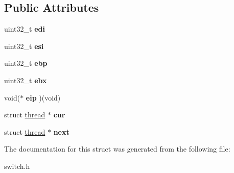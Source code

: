 \subsection*{Public Attributes}
\begin{DoxyCompactItemize}
\item 
uint32\+\_\+t {\bfseries edi}\hypertarget{structswitch__threads__frame_a4f8ccb09ef3e05eae1d9442cf2803b14}{}\label{structswitch__threads__frame_a4f8ccb09ef3e05eae1d9442cf2803b14}

\item 
uint32\+\_\+t {\bfseries esi}\hypertarget{structswitch__threads__frame_accf719c0384f6832ab3299fe524168b0}{}\label{structswitch__threads__frame_accf719c0384f6832ab3299fe524168b0}

\item 
uint32\+\_\+t {\bfseries ebp}\hypertarget{structswitch__threads__frame_a4097c9b97cf2e2a06d5315b9c7cab2a2}{}\label{structswitch__threads__frame_a4097c9b97cf2e2a06d5315b9c7cab2a2}

\item 
uint32\+\_\+t {\bfseries ebx}\hypertarget{structswitch__threads__frame_ac3b0ed0a688fa3aae89c0f50550e1c76}{}\label{structswitch__threads__frame_ac3b0ed0a688fa3aae89c0f50550e1c76}

\item 
void($\ast$ {\bfseries eip} )(void)\hypertarget{structswitch__threads__frame_a03417cf6abfc21346097ef4a9fcc5185}{}\label{structswitch__threads__frame_a03417cf6abfc21346097ef4a9fcc5185}

\item 
struct \hyperlink{structthread}{thread} $\ast$ {\bfseries cur}\hypertarget{structswitch__threads__frame_a356ecdfdd2fcc59857cab85b1f2b4266}{}\label{structswitch__threads__frame_a356ecdfdd2fcc59857cab85b1f2b4266}

\item 
struct \hyperlink{structthread}{thread} $\ast$ {\bfseries next}\hypertarget{structswitch__threads__frame_a061c58993096523ce860e859e0706c79}{}\label{structswitch__threads__frame_a061c58993096523ce860e859e0706c79}

\end{DoxyCompactItemize}


The documentation for this struct was generated from the following file\+:\begin{DoxyCompactItemize}
\item 
switch.\+h\end{DoxyCompactItemize}
